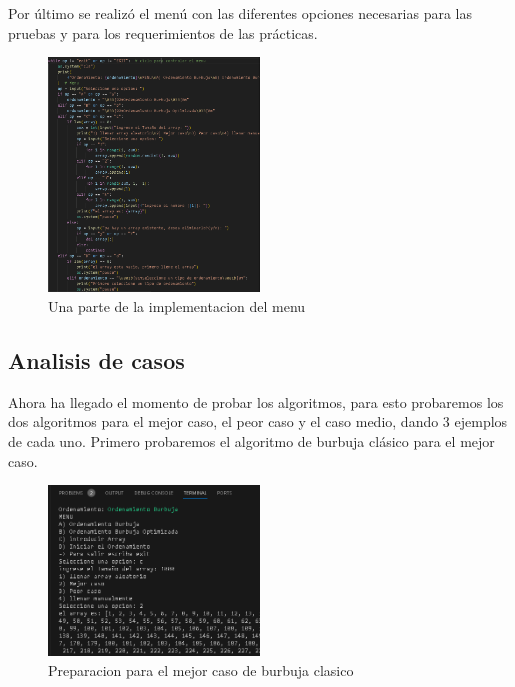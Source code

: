 \documentclass[journal]{IEEEtran}
\begin{document}
Por último se realizó el menú con las diferentes 
opciones necesarias para las pruebas y para los 
requerimientos de las prácticas.

\begin{figure}[H]
    \centering
    \begin{adjustbox}{clip=false}
      \includegraphics[width=0.5\textwidth]{3.PNG}
    \end{adjustbox}
    \caption{Una parte de la implementacion del menu}
  \end{figure}

\subsection{Analisis de casos}
Ahora ha llegado el momento de probar los algoritmos, 
para esto probaremos los dos algoritmos para el mejor 
caso, el peor caso y el caso medio, dando 3 ejemplos de 
cada uno. Primero probaremos el algoritmo de burbuja 
clásico para el mejor caso.

\begin{figure}[H]
    \centering
    \begin{adjustbox}{clip=false}
      \includegraphics[width=0.5\textwidth]{4.PNG}
    \end{adjustbox}
    \caption{Preparacion para el mejor caso de burbuja clasico}
  \end{figure}
\end{document}
